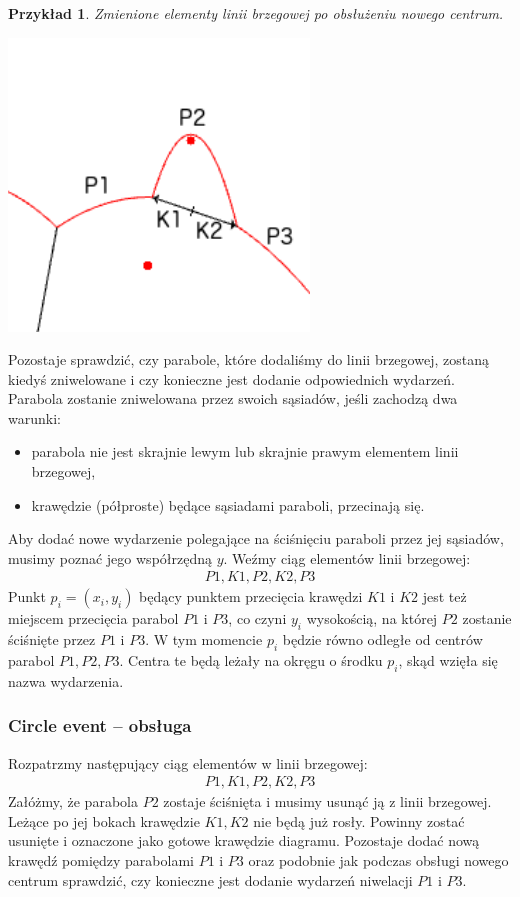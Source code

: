\documentclass[declaration,shortabstract, inz]{iithesis}
\theoremstyle{definition} \newtheorem{definition}{Definicja}[]
\theoremstyle{plain} \newtheorem{remark}[definition]{Obserwacja}
\theoremstyle{plain} \newtheorem{theorem}[definition]{Twierdzenie}
\theoremstyle{plain} \newtheorem{example}{Przykład}[definition]
\theoremstyle{plain} \newtheorem{lemma}[definition]{Lemat}
\begin{document}
\begin{example}
	Zmienione elementy linii brzegowej po obsłużeniu nowego centrum.
	
	\begin{center}
		\includegraphics[width=0.6\textwidth]{ExampleSiteEvent}
	\end{center}
\end{example}

Pozostaje sprawdzić, czy parabole, które dodaliśmy do linii brzegowej, zostaną kiedyś zniwelowane i czy konieczne jest dodanie odpowiednich wydarzeń. 
Parabola zostanie zniwelowana przez swoich sąsiadów, jeśli zachodzą dwa warunki:
\begin{itemize}
	\item parabola nie jest skrajnie lewym lub skrajnie prawym elementem linii brzegowej,
	\item krawędzie (półproste) będące sąsiadami paraboli, przecinają się.
\end{itemize}
Aby dodać nowe wydarzenie polegające na ściśnięciu paraboli przez jej sąsiadów, musimy poznać jego współrzędną $y$. 
Weźmy ciąg elementów linii brzegowej:
\begin{align}
	P1, K1, P2, K2, P3
\end{align}
Punkt $p_i = (x_i, y_i)$ będący punktem przecięcia krawędzi $K1$ i $K2$ jest też miejscem przecięcia parabol $P1$ i $P3$, co czyni $y_i$
wysokością, na której $P2$ zostanie ściśnięte przez $P1$ i $P3$. W tym momencie $p_i$ będzie równo odległe od centrów parabol $P1, P2, P3$. Centra te będą leżały na okręgu o środku $p_i$, skąd wzięła się nazwa wydarzenia.


\subsubsection{Circle event -- obsługa}
\label{sec:circle}
Rozpatrzmy następujący ciąg elementów w linii brzegowej:
\begin{align}
	P1, K1, P2, K2, P3
\end{align}
Załóżmy, że parabola $P2$ zostaje ściśnięta i musimy usunąć ją z linii brzegowej. Leżące po jej bokach krawędzie $K1, K2$ nie będą już rosły. Powinny zostać usunięte i oznaczone jako gotowe krawędzie diagramu. Pozostaje dodać nową krawędź pomiędzy parabolami $P1$ i $P3$ oraz podobnie jak podczas obsługi nowego centrum sprawdzić, czy konieczne jest dodanie wydarzeń niwelacji $P1$ i $P3$.
\end{document}
